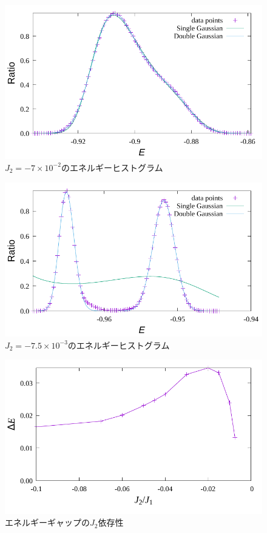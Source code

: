 \documentclass[12pt,titlepage,dvipdfmx]{jarticle}
\begin{document}
\begin{figure}[H]
   \centering
   \includegraphics[width=12cm]{figure/energy_histogram_j2_-7e-2.pdf}
   \caption{$J_2=-7\times10^{-2}$のエネルギーヒストグラム}
\end{figure}

\begin{figure}[H]
   \centering
   \includegraphics[width=12cm]{figure/energy_histogram_j2_-7.5e-3.pdf}
   \caption{$J_2=-7.5\times10^{-3}$のエネルギーヒストグラム}
\end{figure}

\begin{figure}[H]
   \centering
   \includegraphics[width=12cm]{figure/energy_gap.pdf}
   \caption{エネルギーギャップの$J_2$依存性}
\end{figure}
\end{document}
